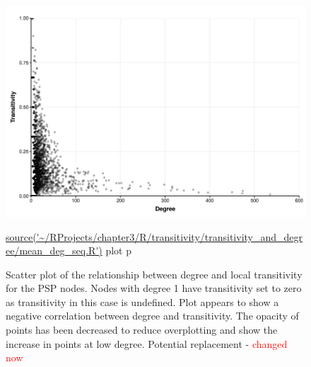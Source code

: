 \begin{figure}
    \centering
    \includegraphics[width=\textwidth]{images/chapter3/ggplot2/degree_and_transitivity/Rplot_scatterplot_c_and_degree_new_format.png}
      \caption{Scatter plot of the relationship between degree and local transitivity for the PSP nodes. Nodes with degree 1 have transitivity set to zero as transitivity in this case is undefined. Plot appears to show a negative correlation between degree and transitivity. The opacity of points has been decreased to reduce overplotting and show the increase in points at low degree. Potential replacement - \textcolor{red}{changed now} }
      \tiny\url{source('~/RProjects/chapter3/R/transitivity/transitivity_and_degree/mean_deg_seq.R')} plot p
    \label{fig:Scatter plot of the relationship between degree and local transitivity for the PSP nodes}
    
\end{figure}


